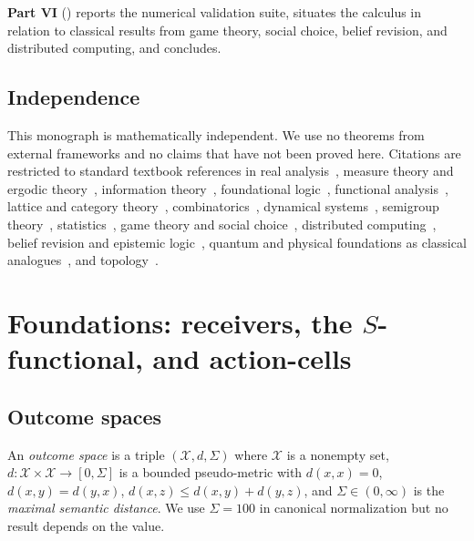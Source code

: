 \documentclass[11pt,a4paper]{article}
\newcommand{\X}{\mathcal{X}}
\begin{document}
\textbf{Part VI}
()
reports the numerical validation suite, situates the calculus in
relation to classical results from game theory, social choice, belief
revision, and distributed computing, and concludes.

\subsection{Independence}

This monograph is mathematically independent. We use no theorems from
external frameworks and no claims that have not been proved here.
Citations are restricted to standard textbook references in real
analysis~\cite{rudin1987,halmos1950}, measure theory and ergodic
theory~\cite{walters1982,birkhoff1931}, information
theory~\cite{shannon1948,coverthomas2006,kullback1951,fisher1925},
foundational logic~\cite{godel1931,tarski1933,turing1936,chaitin1974,
church1936}, functional analysis~\cite{banach1922,koopman1931,
stone1936}, lattice and category
theory~\cite{birkhoff1967,maclane1998,awodey2010,barrwells1990},
combinatorics~\cite{andrews1976,stanley2011}, dynamical
systems~\cite{khalil2002,teschl2012,nakahara2003}, semigroup
theory~\cite{howie1995}, statistics~\cite{lehmann2006,wasserman2004,
kolmogorov1933,borel1909,cantelli1917}, game theory and social
choice~\cite{vonneumannmorgenstern1944,nash1951,schelling1960,
aumann1976,lewis1969,arrow1951,harsanyi1977}, distributed
computing~\cite{fischer1985,lamport1982,lynch1996,shoham2008}, belief
revision and epistemic
logic~\cite{alchourron1985,fagin1995,hintikka1962,aumann1999},
quantum and physical foundations as classical
analogues~\cite{vonneumann1932,heisenberg1927,boltzmann1877,
landauer1961,bennett1973}, and topology~\cite{kelley1955,munkres2000}.

\section{Foundations: receivers, the \texorpdfstring{$S$}{S}-functional,
and action-cells}
\label{sec:foundations}

\subsection{Outcome spaces}

\begin{definition}\label{def:outcome}
An \emph{outcome space} is a triple $(\X,d,\Sigma)$ where $\X$ is a
nonempty set, $d:\X\times\X\to[0,\Sigma]$ is a bounded pseudo-metric
with $d(x,x)=0$, $d(x,y)=d(y,x)$, $d(x,z)\le d(x,y)+d(y,z)$, and
$\Sigma\in(0,\infty)$ is the \emph{maximal semantic distance}. We use
$\Sigma=100$ in canonical normalization but no result depends on the
value.
\end{definition}
\end{document}

